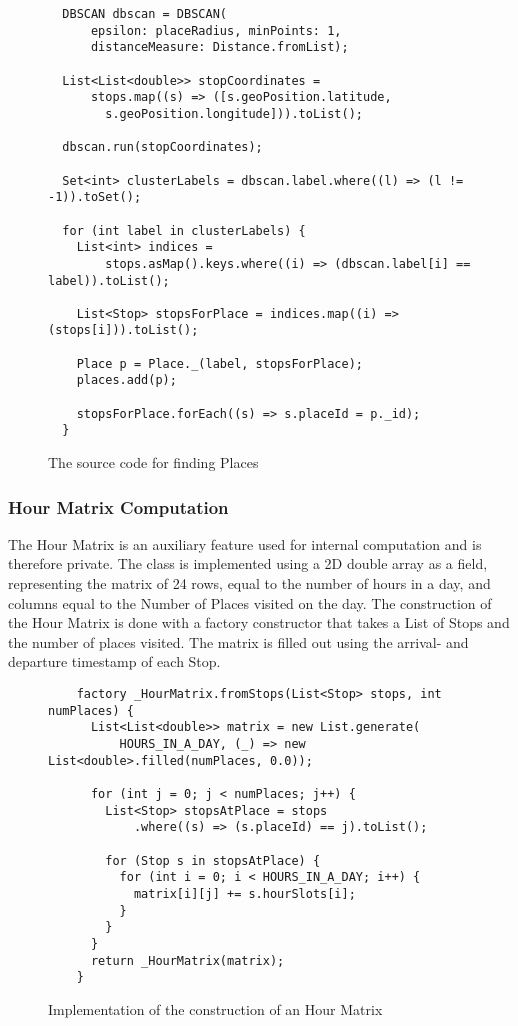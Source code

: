 \begin{figure}[h]
    \centering
   \begin{verbatim}
  DBSCAN dbscan = DBSCAN(
      epsilon: placeRadius, minPoints: 1, 
      distanceMeasure: Distance.fromList);
  
  List<List<double>> stopCoordinates =
      stops.map((s) => ([s.geoPosition.latitude, 
        s.geoPosition.longitude])).toList();

  dbscan.run(stopCoordinates);

  Set<int> clusterLabels = dbscan.label.where((l) => (l != -1)).toSet();

  for (int label in clusterLabels) {
    List<int> indices =
        stops.asMap().keys.where((i) => (dbscan.label[i] == label)).toList();

    List<Stop> stopsForPlace = indices.map((i) => (stops[i])).toList();

    Place p = Place._(label, stopsForPlace);
    places.add(p);

    stopsForPlace.forEach((s) => s.placeId = p._id);
  }
\end{verbatim}
    \caption{The source code for finding Places}
    \label{fig:source-code-places}
\end{figure}


\subsubsection*{Hour Matrix Computation}
The Hour Matrix is an auxiliary feature used for internal computation and is therefore private. The class is implemented using a 2D double array as a field, representing the matrix of 24 rows, equal to the number of hours in a day, and columns equal to the Number of Places visited on the day. The construction of the Hour Matrix is done with a factory constructor that takes a List of Stops and the number of places visited. The matrix is filled out using the arrival- and departure timestamp of each Stop.

\begin{figure}[h]
    \centering
    \begin{verbatim}
    factory _HourMatrix.fromStops(List<Stop> stops, int numPlaces) {
      List<List<double>> matrix = new List.generate(
          HOURS_IN_A_DAY, (_) => new List<double>.filled(numPlaces, 0.0));
    
      for (int j = 0; j < numPlaces; j++) {
        List<Stop> stopsAtPlace = stops
            .where((s) => (s.placeId) == j).toList();
    
        for (Stop s in stopsAtPlace) {
          for (int i = 0; i < HOURS_IN_A_DAY; i++) {
            matrix[i][j] += s.hourSlots[i];
          }
        }
      }
      return _HourMatrix(matrix);
    }
    \end{verbatim}
    \caption{Implementation of the construction of an Hour Matrix}
    \label{fig:hour-matrix-construction}
\end{figure}

